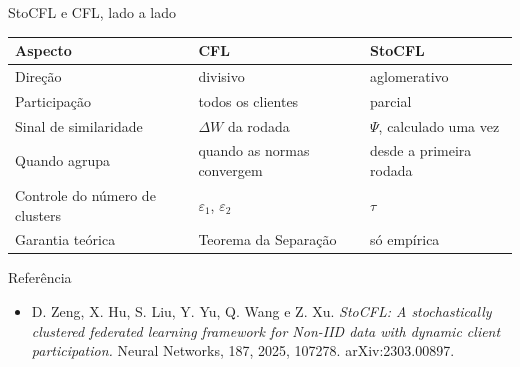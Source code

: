 \documentclass[aspectratio=169]{beamer}
\begin{document}
\begin{frame}{StoCFL e CFL, lado a lado}
  \begin{center}
    \begin{tabular}{@{}lll@{}}
      \toprule
      Aspecto & CFL & StoCFL \\
      \midrule
      Direção & divisivo & aglomerativo \\
      Participação & todos os clientes & parcial \\
      Sinal de similaridade & $\Delta W$ da rodada & $\Psi$, calculado uma vez \\
      Quando agrupa & quando as normas convergem & desde a primeira rodada \\
      Controle do número de clusters & $\varepsilon_1$, $\varepsilon_2$ & $\tau$ \\
      Garantia teórica & Teorema da Separação & só empírica \\
      \bottomrule
    \end{tabular}
  \end{center}
\end{frame}

\begin{frame}{Referência}
  \begin{itemize}
    \item D. Zeng, X. Hu, S. Liu, Y. Yu, Q. Wang e Z. Xu. \emph{StoCFL: A stochastically
      clustered federated learning framework for Non-IID data with dynamic client participation.}
      Neural Networks, 187, 2025, 107278. arXiv:2303.00897.
  \end{itemize}
\end{frame}
\end{document}
